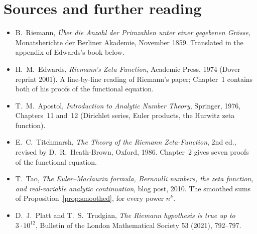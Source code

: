 \section*{Sources and further reading}

\begin{itemize}
\item B.~Riemann, \emph{\"Uber die Anzahl der Primzahlen unter einer gegebenen Gr\"osse}, Monatsberichte der Berliner
Akademie, November 1859. Translated in the appendix of Edwards's book below.
\item H.~M.~Edwards, \emph{Riemann's Zeta Function}, Academic Press, 1974 (Dover reprint 2001). A line-by-line reading of
Riemann's paper; Chapter~1 contains both of his proofs of the functional equation.
\item T.~M.~Apostol, \emph{Introduction to Analytic Number Theory}, Springer, 1976, Chapters~11 and~12 (Dirichlet series,
Euler products, the Hurwitz zeta function).
\item E.~C.~Titchmarsh, \emph{The Theory of the Riemann Zeta-Function}, 2nd ed., revised by D.~R.~Heath-Brown, Oxford, 1986.
Chapter~2 gives seven proofs of the functional equation.
\item T.~Tao, \emph{The Euler--Maclaurin formula, Bernoulli numbers, the zeta function, and real-variable analytic continuation},
blog post, 2010. The smoothed sums of Proposition~\ref{prop:smoothed}, for every power $n^k$.
\item D.~J.~Platt and T.~S.~Trudgian, \emph{The Riemann hypothesis is true up to $3\cdot10^{12}$}, Bulletin of the London Mathematical
Society 53 (2021), 792--797.
\end{itemize}
